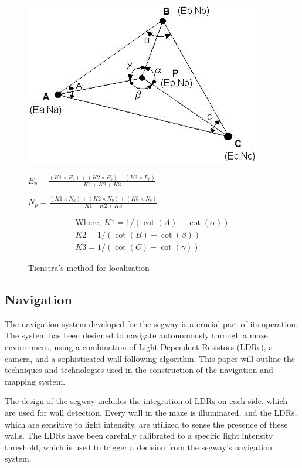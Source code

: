 \begin{figure}
    \centering
    \includegraphics{images/Tienstra.png}

    \(E_p = \frac{(K1 \times E_a)+(K2 \times E_b)+(K3 \times E_c)}{K1 + K2 + K3} \)

    \(N_p = \frac{(K1 \times N_a)+(K2 \times N_b)+(K3 \times N_c)}{K1 + K2 + K3} \)

    \begin{equation}
        \begin{split}
        \text{Where, } K1 = 1 / (\cot(A) - \cot(\alpha)) \\
            K2 = 1 / (\cot(B) - \cot(\beta)) \\
            K3 = 1 / (\cot(C) - \cot(\gamma))
        \end{split}
    \end{equation}
    \caption{Tienstra’s method for localisation}
    \label{fig:Tienstra}
\end{figure}

\subsection{Navigation}

The navigation system developed for the segway is a crucial part of its operation. The system has been designed to navigate autonomously through a maze environment, using a combination of Light-Dependent Resistors (LDRs), a camera, and a sophisticated wall-following algorithm. This paper will outline the techniques and technologies used in the construction of the navigation and mapping system.

The design of the segway includes the integration of LDRs on each side, which are used for wall detection. Every wall in the maze is illuminated, and the LDRs, which are sensitive to light intensity, are utilized to sense the presence of these walls. The LDRs have been carefully calibrated to a specific light intensity threshold, which is used to trigger a decision from the segway's navigation system.

